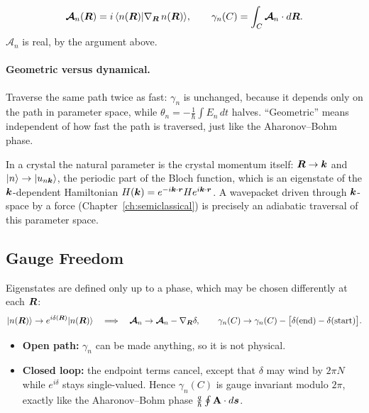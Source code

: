 \begin{definition}
\[
    \bm{\mathcal{A}}_n(\bm{R}) = i\,\langle n(\bm{R})|\nabla_{\bm{R}}\,n(\bm{R})\rangle,
    \qquad
    \gamma_n(C) = \int_C\bm{\mathcal{A}}_n\cdot d\bm{R} .
\]
$\bm{\mathcal{A}}_n$ is real, by the argument above.
\end{definition}

\paragraph{Geometric versus dynamical.} Traverse the same path twice as fast: $\gamma_n$ is unchanged, because it depends only on the path in parameter space, while $\theta_n = -\frac1\hbar\int E_n\,dt$ halves. ``Geometric'' means independent of how fast the path is traversed, just like the Aharonov--Bohm phase.

In a crystal the natural parameter is the crystal momentum itself: $\bm{R}\to\bm{k}$ and $|n\rangle\to|u_{n\bm{k}}\rangle$, the periodic part of the Bloch function, which is an eigenstate of the $\bm{k}$-dependent Hamiltonian $H(\bm{k}) = e^{-i\bm{k}\cdot\bm{r}}He^{i\bm{k}\cdot\bm{r}}$. A wavepacket driven through $\bm{k}$-space by a force (Chapter~\ref{ch:semiclassical}) is precisely an adiabatic traversal of this parameter space.

\subsection{Gauge Freedom}

Eigenstates are defined only up to a phase, which may be chosen differently at each $\bm{R}$:
\[
    |n(\bm{R})\rangle\to e^{i\delta(\bm{R})}|n(\bm{R})\rangle
    \quad\Longrightarrow\quad
    \bm{\mathcal{A}}_n\to\bm{\mathcal{A}}_n - \nabla_{\bm{R}}\delta,
    \qquad
    \gamma_n(C)\to\gamma_n(C) - \bigl[\delta(\text{end}) - \delta(\text{start})\bigr].
\]
\begin{itemize}
    \item \textbf{Open path:} $\gamma_n$ can be made anything, so it is not physical.
    \item \textbf{Closed loop:} the endpoint terms cancel, except that $\delta$ may wind by $2\pi N$ while $e^{i\delta}$ stays single-valued. Hence $\gamma_n(C)$ is gauge invariant modulo $2\pi$, exactly like the Aharonov--Bohm phase $\frac q\hbar\oint\cvect{A}\cdot d\lvect{s}$.
\end{itemize}

